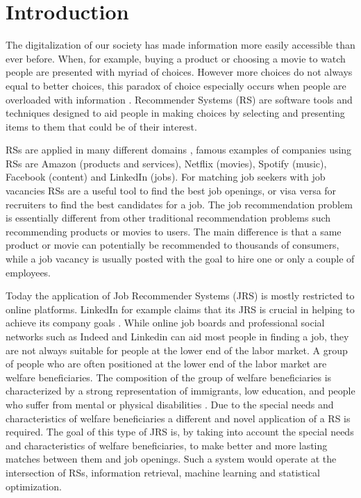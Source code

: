 \section{Introduction}
\label{sec:intro}




The digitalization of our society has made information more easily accessible than ever before.
When, for example, buying a product or choosing a movie to watch people are presented with myriad of choices. 
However more choices do not always equal to better choices, this paradox of choice especially occurs when people are overloaded with information \cite{schwartz2004paradox}. 
Recommender Systems (RS) are software tools and techniques designed to aid people in making choices by selecting and presenting items to them that could be of their interest.

RSs are applied in many different domains \cite{aggarwal2016recommender}, famous examples of companies using RSs are Amazon (products and services), Netflix (movies), Spotify (music), Facebook (content) and LinkedIn (jobs).
For matching job seekers with job vacancies RSs are a useful tool to find the best job openings, or visa versa for recruiters to find the best candidates for a job.
The job recommendation problem is essentially different from other traditional recommendation problems such recommending products or movies to users.
The main difference is that a same product or movie can potentially be recommended to thousands of consumers, while a job vacancy is usually posted with the goal to hire one or only a couple of employees.

Today the application of Job Recommender Systems (JRS) is mostly restricted to online platforms. 
LinkedIn for example claims that its JRS is crucial in helping to achieve its company goals \cite{kenthapadi2017personalized}.
While online job boards and professional social networks such as Indeed and Linkedin can aid most people in finding a job, they are not always suitable for people at the lower end of the labor market.
A group of people who are often positioned at the lower end of the labor market are welfare beneficiaries. 
The composition of the group of welfare beneficiaries is characterized by a strong representation of immigrants, low education, and people who suffer from mental or physical disabilities \cite{dodeweerd}.
Due to the special needs and characteristics of welfare beneficiaries a different and novel application of a RS is required. 
The goal of this type of JRS is, by taking into account the special needs and characteristics of welfare beneficiaries, to make better and more lasting matches between them and job openings.
Such a system would operate at the intersection of RSs, information retrieval, machine learning and statistical optimization. 

